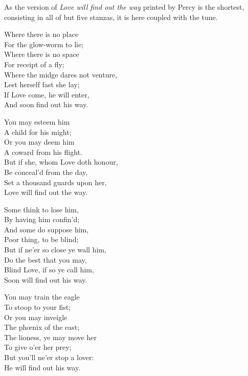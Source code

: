 As the version of \textit{Love will find out the way} printed by Percy is the shortest,
consisting in all of but five stanzas, it is here coupled with the tune.



\pagebreak

\settowidth{\versewidth}{Where the midge dares not venture,}
\begin{dcverse}\begin{altverse}
Where there is no place\\
For the glow-worm to lie;\\
Where there is no space\\
For receipt of a fly;\\
Where the midge dares not venture,\\
Lest herself fast she lay;\\
If Love come, he will enter,\\
And soon find out his way.
\end{altverse}

\begin{altverse}
You may esteem him\\
A child for his might;\\
Or you may deem him\\
A coward from his flight.\\
But if she, whom Love doth honour,\\
Be conceal’d from the day,\\
Set a thousand guards upon her,\\
Love will find out the way.
\end{altverse}

\begin{altverse}
Some think to lose him,\\
By having him confin’d;\\
And some do suppose him,\\
Poor thing, to be blind;\\
But if ne’er so close ye wall him,\\
Do the best that you may,\\
Blind Love, if so ye call him,\\
Soon will find out his way.
\end{altverse}

\begin{altverse}
You may train the eagle\\
To stoop to your fist;\\
Or you may inveigle\\
The phœnix of the east;\\
The lioness, ye may move her\\
To give o’er her prey;\\
But you’ll ne’er stop a lover:\\
He will find out his way.
\end{altverse}
\end{dcverse}

